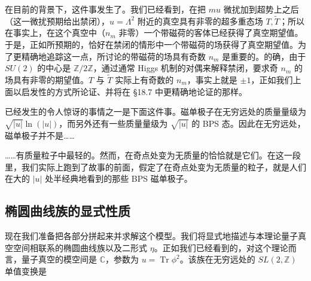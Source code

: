 在目前的背景下，这件事发生了。我们已经看到，在把 $mu$ 微扰加到超势上之后（这一微扰预期给出禁闭），$u=\Lambda^2$ 附近的真空具有非零的超多重态场 $T,\tilde T$；所以在事实上，在这个真空中（$n_m$ 非零）一个带磁荷的客体已经获得了真空期望值。于是，正如所预期的，恰好在禁闭的情形中一个带磁荷的场获得了真空期望值。为了更精确地追踪这一点，所讨论的带磁荷的场具有奇数 $n_m$ 是重要的。的确，由于 $SU(2)$ 的中心是 $\mathbb{Z}/2\mathbb{Z}$，通过通常 Higgs 机制的对偶来解释禁闭，要求奇 $n_m$ 的场具有非零的期望值。$T$ 与 $\tilde T$ 实际上有奇数的 $n_m$，事实上就是 $\pm1$，正如我们上面以启发性的方式所论证、并将在 §18.7 中更精确地论证的那样。

已经发生的令人惊讶的事情之一是下面这件事。磁单极子在无穷远处的质量量级为 $\sqrt{|u|}\ln(|u|)$，而另外还有一些质量量级为 $\sqrt{|u|}$ 的 BPS 态。因此在无穷远处，磁单极子并不是……


……有质量粒子中最轻的。然而，在奇点处变为无质量的恰恰就是它们。在这一段里，我们实际上跑到了故事的前面，假定了在奇点处变为无质量的粒子，就是人们在大的 $|u|$ 处半经典地看到的那些 BPS 磁单极子。

\subsection{椭圆曲线族的显式性质}

现在我们准备把各部分拼起来并求解这个模型。我们将显式地描述与本理论量子真空空间相联系的椭圆曲线族以及二形式 $\eta$。正如我们已经看到的，对这个理论而言，量子真空的模空间是 $\mathbb{C}$，参数为 $u=\operatorname{Tr}\phi^2$。该族在无穷远处的 $SL(2,\mathbb{Z})$ 单值变换是

